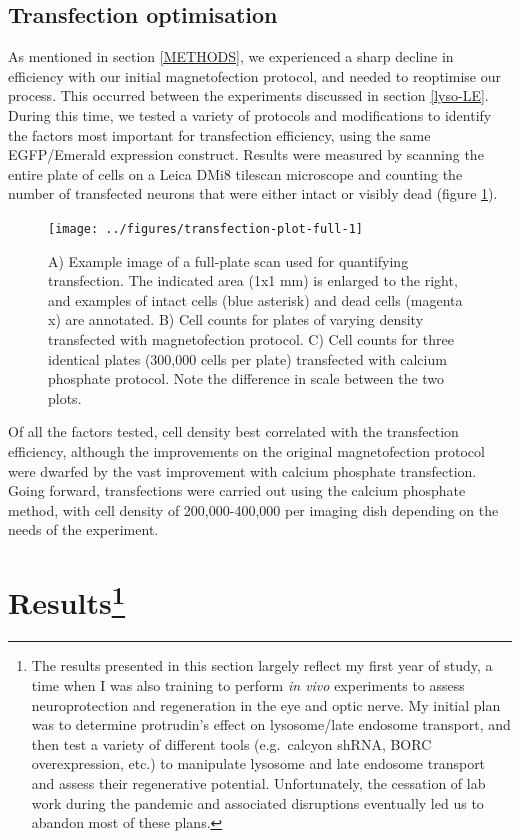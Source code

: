 \documentclass[
  12pt,
  a4paper,
]{book}
\begin{document}
\subsection{Transfection optimisation}\label{transfection-optimisation}

As mentioned in section \ref{METHODS}, we experienced a sharp decline in efficiency with our initial magnetofection protocol, and needed to reoptimise our process. This occurred between the experiments discussed in section \ref{lyso-LE}. During this time, we tested a variety of protocols and modifications to identify the factors most important for transfection efficiency, using the same EGFP/Emerald expression construct. Results were measured by scanning the entire plate of cells on a Leica DMi8 tilescan microscope and counting the number of transfected neurons that were either intact or visibly dead (figure \ref{fig:transfection-plot-full}).

\begin{figure}[!h]
\texttt{[image: ../figures/transfection-plot-full-1]} \caption[Transfection optimisation plot]{A) Example image of a full-plate scan used for quantifying transfection.  The indicated area (1x1 mm) is enlarged to the right, and examples of intact cells (blue asterisk) and dead cells (magenta x) are annotated. B) Cell counts for plates of varying density transfected with magnetofection protocol.  C) Cell counts for three identical plates (300,000 cells per plate) transfected with calcium phosphate protocol.  Note the difference in scale between the two plots.}\label{fig:transfection-plot-full}
\end{figure}

Of all the factors tested, cell density best correlated with the transfection efficiency, although the improvements on the original magnetofection protocol were dwarfed by the vast improvement with calcium phosphate transfection. Going forward, transfections were carried out using the calcium phosphate method, with cell density of 200,000-400,000 per imaging dish depending on the needs of the experiment.

\section[Results]{\texorpdfstring{Results\footnote{The results presented in this section largely reflect my first year of study, a time when I was also training to perform \emph{in vivo} experiments to assess neuroprotection and regeneration in the eye and optic nerve. My initial plan was to determine protrudin's effect on lysosome/late endosome transport, and then test a variety of different tools (e.g.~calcyon shRNA, BORC overexpression, etc.) to manipulate lysosome and late endosome transport and assess their regenerative potential. Unfortunately, the cessation of lab work during the pandemic and associated disruptions eventually led us to abandon most of these plans.}}{Results}}\label{results}
\end{document}
